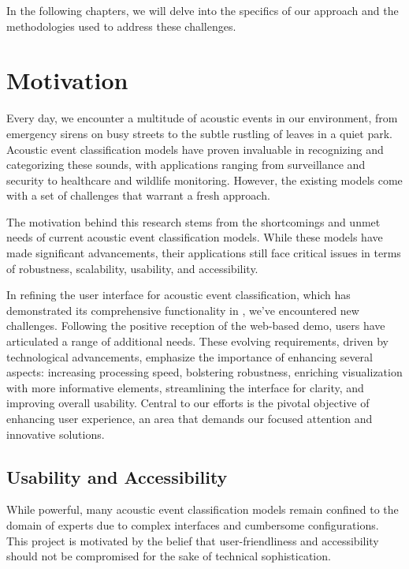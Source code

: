 In the following chapters, we will delve into the specifics of our approach and the methodologies used to address these challenges.

\section{Motivation}


Every day, we encounter a multitude of acoustic events in our environment, from emergency sirens on busy streets to the subtle rustling of leaves in a quiet park. Acoustic event classification models have proven invaluable in recognizing and categorizing these sounds, with applications ranging from surveillance and security to healthcare and wildlife monitoring. However, the existing models come with a set of challenges that warrant a fresh approach.

The motivation behind this research stems from the shortcomings and unmet needs of current acoustic event classification models. While these models have made significant advancements, their applications still face critical issues in terms of robustness, scalability, usability, and accessibility.

In refining the user interface for acoustic event classification, which has demonstrated its comprehensive functionality in \cite{sampath2019realtime}, we've encountered new challenges. Following the positive reception of the web-based demo, users have articulated a range of additional needs. These evolving requirements, driven by technological advancements, emphasize the importance of enhancing several aspects: increasing processing speed, bolstering robustness, enriching visualization with more informative elements, streamlining the interface for clarity, and improving overall usability. Central to our efforts is the pivotal objective of enhancing user experience, an area that demands our focused attention and innovative solutions.


\subsection{Usability and Accessibility}
While powerful, many acoustic event classification models remain confined to the domain of experts due to complex interfaces and cumbersome configurations. This project is motivated by the belief that user-friendliness and accessibility should not be compromised for the sake of technical sophistication.

